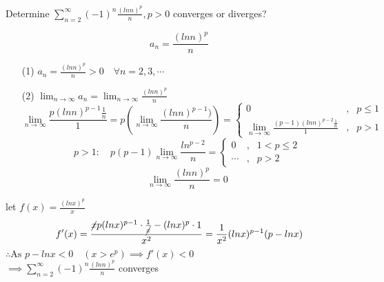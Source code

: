 \begin{eg}
Determine \(\displaystyle \sum^{\infty}_{n = 2} (-1)^n \frac{(ln n)^p}{n}, p > 0\)  converges or diverges?

\soln
\[a_n = \frac{(ln n)^p}{n}\]
\begin{itemize}
\item[(1)] \(a_n = \frac{(ln n )^p}{n} > 0 \quad \forall n = 2, 3, \cdots\)
\item[(2)] \(\displaystyle \lim_{n \to \infty} a_n = \lim_{n \to \infty} \frac{(ln n)^p}{n}\)
\[\displaystyle \lim_{n \to \infty} \frac{p(ln n)^{p - 1} \frac{1}{n}}{1} = p (\lim_{n \to \infty} \frac{(ln n)^{p - 1})}{n})= \left\{\begin{array}{ccl}
0 & , & p \leq 1\\
\displaystyle \lim_{n \to \infty} \frac{(p - 1)(ln n)^{p - 2} \frac{1}{n}}{1} & , & p > 1
\end{array}\right.\]
\[\displaystyle p > 1: \quad p( p - 1) \lim_{n \to \infty} \frac{ln^{p - 2}}{n} = \left\{\begin{array}{ccl}
0 & , & 1 < p \leq 2\\
\cdots & , & p > 2
\end{array}\right.\]
\[\displaystyle \lim_{n \to \infty} \frac{(ln n)^p}{n} = 0\]
\end{itemize}
let \(\displaystyle f(x) = \frac{(ln x)^p}{x}\)
\[f'(x) =\frac{\cancel{x} p (ln x)^{p - 1} \cdot \frac{1}{\cancel{x}} - (ln x)^p \cdot 1}{x^2} = \frac{1}{x^2} (ln x)^{p - 1} (p - lnx)\]
\(\therefore \text{As } p - ln x < 0 \quad (x > e^p) \implies f'(x) < 0\)\\
\(\implies \displaystyle \sum^{\infty}_{n = 2} (-1)^n \frac{(ln n )^p}{n}\) converges
\end{eg}
